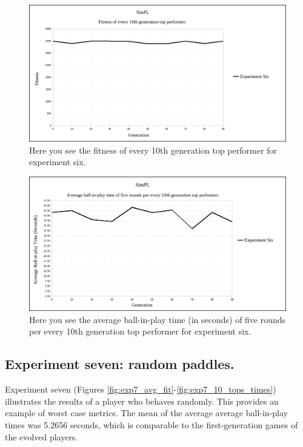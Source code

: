 \begin{figure}[htbp]  
  \centering
  \includegraphics[width=5in]{../Figures/Chapter3/exp6_10_tops.png}
  \caption[Experiment Six Top Performers]{Here you see the fitness of every 10th generation top performer for experiment six.}
  \label{fig:exp6_10_tops}
\end{figure}

\begin{figure}[htbp]  
  \centering
  \includegraphics[width=5in]{../Figures/Chapter3/exp6_10_tops_times.png}
  \caption[Experiment Six Top Performers Tournament]{Here you see the average ball-in-play time (in seconds) of five rounds per every 10th generation top performer for experiment six.}
  \label{fig:exp6_10_tops_times}
\end{figure}

\subsection[Experiment Seven]{Experiment seven: random paddles.}

Experiment seven (Figures \ref{fig:exp7_avg_fit}-\ref{fig:exp7_10_tops_times}) illustrates the results of a player who behaves randomly. This provides an example of worst case metrics. The mean of the average average ball-in-play times was 5.2656 seconds, which is comparable to the first-generation games of the evolved players.

